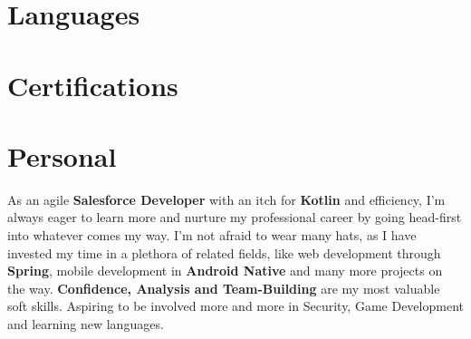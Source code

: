 \documentclass[10pt,a4paper,hidelinks]{moderncv}
\begin{document}
\hfill



\section{Languages}
\closesection{}

\hfill



\section{Certifications}
\closesection{}

\hfill



\section{Personal}
As an agile \textbf{Salesforce Developer} with an itch for \textbf{Kotlin} and efficiency, I'm always eager to learn more and nurture my professional career by going head-first into whatever comes my way. I'm not afraid to wear many hats, as I have invested my time in a plethora of related fields, like web development through \textbf{Spring}, mobile development in \textbf{Android Native} and many more projects on the way. \textbf{Confidence, Analysis and Team-Building} are my most valuable soft skills. Aspiring to be involved more and more in Security, Game Development and learning new languages.
\closesection{}
\end{document}
